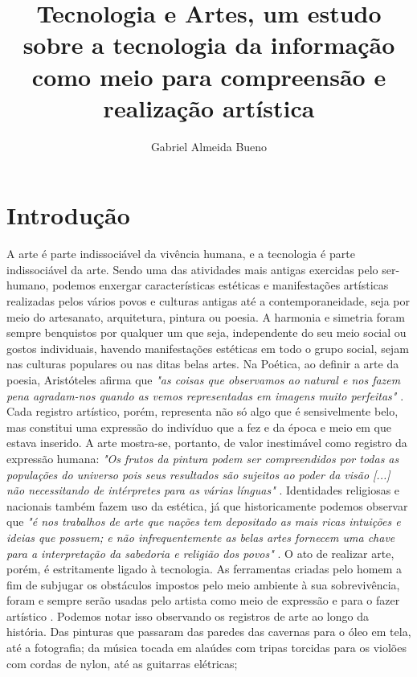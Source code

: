 \documentclass[12pt, a4paper, titlepage]{article}
\author{Gabriel Almeida Bueno}
\affil{FATEC Zona Sul}
\title{Tecnologia e Artes, um estudo sobre a tecnologia da informação como meio para compreensão e realização artística}
\begin{document}
\maketitle

\section{Introdução}
A arte é parte indissociável da vivência humana, e a tecnologia é parte indissociável da arte. 
Sendo uma das atividades mais antigas exercidas pelo ser-humano, podemos enxergar características estéticas e manifestações artísticas realizadas pelos vários povos e culturas antigas até a contemporaneidade, seja por meio do artesanato, arquitetura, pintura ou poesia.
A harmonia e simetria foram sempre benquistos por qualquer um que seja,
independente do seu meio social ou gostos individuais, havendo manifestações estéticas em todo o grupo social, sejam nas culturas populares ou nas ditas belas artes.
Na Poética, ao definir a arte da poesia, Aristóteles afirma que 
\emph{"as coisas que observamos ao natural e nos fazem pena agradam-nos quando as vemos representadas em imagens muito perfeitas"} \cite[p.42]{aristotle_poetics}.
Cada registro artístico, porém, representa não só algo que é sensivelmente belo, mas constitui uma expressão do indivíduo que a fez e da época
e meio em que estava inserido. A arte mostra-se, portanto, de valor inestimável como registro da expressão humana:
\emph{"Os frutos da pintura podem ser compreendidos por todas as populações do universo pois seus resultados
são sujeitos ao poder da visão [...] não necessitando de intérpretes para as várias línguas"} \cite{davinci_thoughtsonart}. 
Identidades religiosas e nacionais também fazem uso da estética, já que historicamente podemos observar que
\emph{"é nos trabalhos de arte que nações tem depositado as mais ricas intuições e ideias que possuem; e não 
infrequentemente as belas artes fornecem uma chave para a interpretação da sabedoria e religião dos povos"} \cite{hegel}.
O ato de realizar arte, porém, é estritamente ligado à tecnologia.
As ferramentas criadas pelo homem a fim de subjugar os obstáculos impostos
pelo meio ambiente à sua sobrevivência, foram e sempre serão usadas pelo artista como meio de expressão e para o fazer artístico \cite{gouzouasis}.
Podemos notar isso observando os registros de arte ao longo da história. Das pinturas que passaram das paredes das cavernas para o óleo em tela, até
a fotografia; da música tocada em alaúdes com tripas torcidas para os violões com cordas de nylon, até as guitarras elétricas; 
\end{document}
